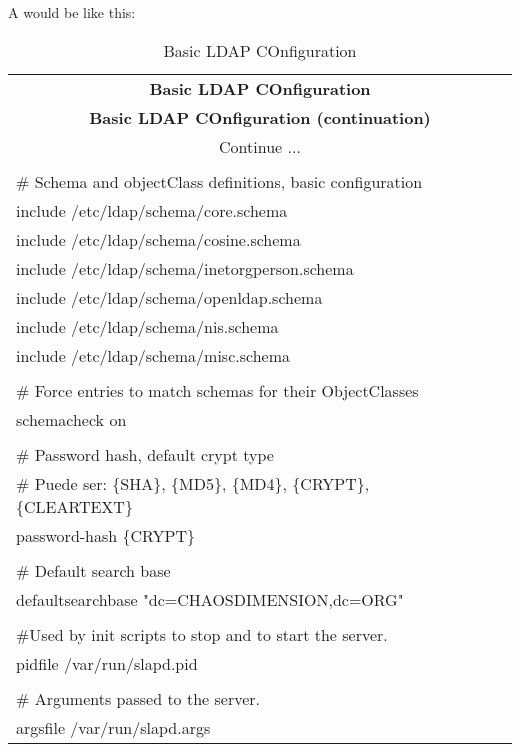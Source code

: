 \noindent A  would be like this: 
\begin{center}
\begin{longtable}{|ll|}\hline
\caption{Basic LDAP COnfiguration}\\
\hline \hline
\multicolumn{2}{|c|}{\textbf{Basic LDAP COnfiguration}}\\
\hline \hline
\endfirsthead
\hline \hline
\multicolumn{2}{|c|}{\textbf{Basic LDAP COnfiguration (continuation)}}\\
\hline \hline
\endhead
\hline
\multicolumn{2}{|c|}{Continue $\ldots$}\\
\hline
\endfoot
\hline
\multicolumn{2}{|c|}{\textbf{End}}\\
\hline
\endlastfoot
\# Schema and objectClass definitions, basic configuration & \\
include         /etc/ldap/schema/core.schema & \\
include         /etc/ldap/schema/cosine.schema & \\
include         /etc/ldap/schema/inetorgperson.schema & \\
include         /etc/ldap/schema/openldap.schema & \\
include         /etc/ldap/schema/nis.schema & \\
include         /etc/ldap/schema/misc.schema & \\
 & \\
\# Force entries to match schemas for their ObjectClasses & \\
schemacheck             on & \\
 & \\
\# Password hash, default crypt type & \\
\# Puede ser: \{SHA\}, \{MD5\}, \{MD4\}, \{CRYPT\}, \{CLEARTEXT\} & \\
password-hash           \{CRYPT\} & \\
 & \\
\# Default search base & \\
defaultsearchbase       "dc=CHAOSDIMENSION,dc=ORG" & \\
 & \\
\#Used by init scripts to stop and to start the server. & \\
pidfile         /var/run/slapd.pid & \\
 & \\
\# Arguments passed to the server. & \\
argsfile        /var/run/slapd.args & \\

\end{longtable}
\end{center}
